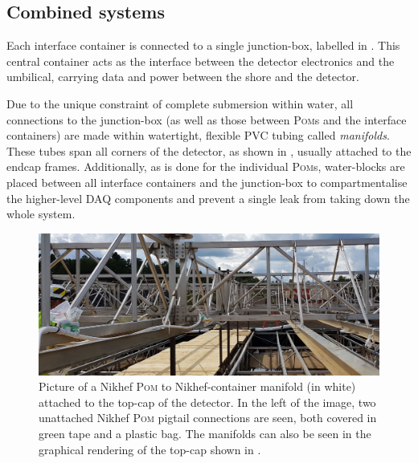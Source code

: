 \subsection{Combined systems} %
\label{sec:daq_hard_combined} %

Each interface container is connected to a single junction-box, labelled in
. This central container acts as the interface between the detector
electronics and the umbilical, carrying data and power between the shore and the detector. 

Due to the unique \chips constraint of complete submersion within water, all connections to the
junction-box (as well as those between \textsc{Pom}s and the interface containers) are made within
watertight, flexible PVC tubing called \emph{manifolds}. These tubes span all corners of the
\chipsfive detector, as shown in , usually attached to the endcap frames.
Additionally, as is done for the individual \textsc{Pom}s, water-blocks are placed between all
interface containers and the junction-box to compartmentalise the higher-level DAQ components and
prevent a single leak from taking down the whole system.

\begin{figure} %
    \includegraphics[width=\textwidth]{diagrams/5-daq/manifold.pdf}
    \caption[Picture of a manifold connection within the \chipsfive detector]
    {Picture of a Nikhef \textsc{Pom} to Nikhef-container manifold (in white) attached to the
        top-cap of the \chipsfive detector. In the left of the image, two unattached Nikhef
        \textsc{Pom} pigtail connections are seen, both covered in green tape and a plastic bag.
        The manifolds can also be seen in the graphical rendering of the top-cap shown in
        .}
    \label{fig:manifold}
\end{figure}

